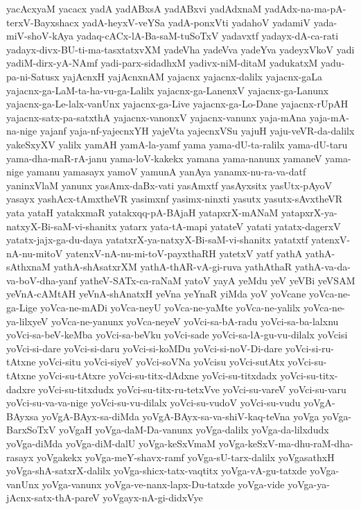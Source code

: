 {yacAcxyaM
yacacx
yadA
yadABxsA
yadABxvi
yadAdxnaM
yadAdx-na-ma-pA-terxV-Bayxshacx
yadA-heyxV-veYSa
yadA-ponxVti
yadahoV
yadamiV
yada-miV-shoV-kAya
yadaq-cACx-lA-Ba-saM-tuSoTxV
yadavxtf
yadayx-dA-ca-rati
yadayx-divx-BU-ti-ma-tasxtatxvXM
yadeVha
yadeVva
yadeYva
yadeyxVkoV
yadi
yadiM-dirx-yA-NAmf
yadi-parx-sidadhxM
yadivx-niM-ditaM
yadukatxM
yadu-pa-ni-Satusx
yajAcnxH
yajAcnxnAM
yajacnx
yajacnx-dalilx
yajacnx-gaLa
yajacnx-ga-LaM-ta-ha-vu-ga-Lalilx
yajacnx-ga-LanenxV
yajacnx-ga-Lanunx
yajacnx-ga-Le-lalx-vanUnx
yajacnx-ga-Live
yajacnx-ga-Lo-Dane
yajacnx-rUpAH
yajacnx-satx-pa-satxthA
yajacnx-vanonxV
yajacnx-vanunx
yaja-mAna
yaja-mA-na-nige
yajanf
yaja-nf-yajecnxYH
yajeVta
yajecnxVSu
yajuH
yaju-veVR-da-dalilx
yakeSxyXV
yalilx
yamAH
yamA-la-yamf
yama
yama-dU-ta-ralilx
yama-dU-taru
yama-dha-maR-rA-janu
yama-loV-kakekx
yamana
yama-nanunx
yamaneV
yama-nige
yamanu
yamasayx
yamoV
yamunA
yanAya
yanamx-nu-ra-va-datf
yaninxVlaM
yanunx
yasAmx-daBx-vati
yasAmxtf
yasAyxsitx
yasUtx-pAyoV
yasayx
yashAcx-tAmxtheVR
yasimxnf
yasimx-ninxti
yasutx
yasutx-sAvxtheVR
yata
yataH
yatakxmaR
yatakxqq-pA-BAjaH
yatapxrX-mANaM
yatapxrX-ya-natxyX-Bi-saM-vi-shanitx
yatarx
yata-tA-mapi
yatateV
yatati
yatatx-dagerxV
yatatx-jajx-ga-du-daya
yatatxrX-ya-natxyX-Bi-saM-vi-shanitx
yatatxtf
yatenxV-nA-nu-mitoV
yatenxV-nA-nu-mi-toV-payxthaRH
yatetxV
yatf
yathA
yathA-sAthxnaM
yathA-shAsatxrXM
yathA-thAR-vA-gi-ruva
yathAthaR
yathA-va-da-va-boV-dha-yanf
yatheV-SATx-ca-raNaM
yatoV
yayA
yeMdu
yeV
yeVBi
yeVSAM
yeVnA-cAMtAH
yeVnA-shAnatxH
yeVna
yeYnaR
yiMda
yoV
yoVcane
yoVca-ne-ga-Lige
yoVca-ne-mADi
yoVca-neyU
yoVca-ne-yaMte
yoVca-ne-yalilx
yoVca-ne-ya-lilxyeV
yoVca-ne-yanunx
yoVca-neyeV
yoVci-sa-bA-radu
yoVci-sa-ba-lalxnu
yoVci-sa-beV-keMba
yoVci-sa-beVku
yoVci-sade
yoVci-sa-lA-gu-vu-dilalx
yoVcisi
yoVci-si-dare
yoVci-si-daru
yoVci-si-koMDu
yoVci-si-noV-Di-dare
yoVci-si-ru-tAtxne
yoVci-situ
yoVci-siyeV
yoVci-soVNa
yoVcisu
yoVci-sutAtx
yoVci-su-tAtxne
yoVci-su-tAtxre
yoVci-su-titx-dAdxne
yoVci-su-titxdadx
yoVci-su-titx-dadxre
yoVci-su-titxdudx
yoVci-su-titx-ru-tetxVve
yoVci-su-vareV
yoVci-su-varu
yoVci-su-va-va-nige
yoVci-su-vu-dilalx
yoVci-su-vudoV
yoVci-su-vudu
yoVgA-BAyxsa
yoVgA-BAyx-sa-diMda
yoVgA-BAyx-sa-va-shiV-kaq-teVna
yoVga
yoVga-BarxSoTxV
yoVgaH
yoVga-daM-Da-vanunx
yoVga-dalilx
yoVga-da-lilxdudx
yoVga-diMda
yoVga-diM-dalU
yoVga-keSxVmaM
yoVga-keSxV-ma-dhu-raM-dha-rasayx
yoVgakekx
yoVga-meY-shavx-ramf
yoVga-sU-tarx-dalilx
yoVgasathxH
yoVga-shA-satxrX-dalilx
yoVga-shicx-tatx-vaqtitx
yoVga-vA-gu-tatxde
yoVga-vanUnx
yoVga-vanunx
yoVga-ve-nanx-lapx-Du-tatxde
yoVga-vide
yoVga-ya-jAcnx-satx-thA-pareV
yoVgayx-nA-gi-didxVye
}
